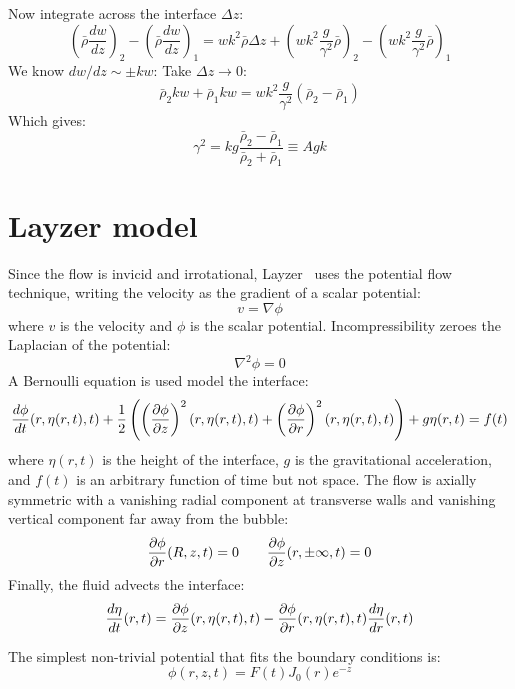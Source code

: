 Now integrate across the interface $\Delta z$:
$$ \left(\bar\rho \frac{dw}{dz}\right)_2 - \left(\bar\rho \frac{dw}{dz}\right)_1 = w k^2 \bar\rho \Delta z  + \left(w k^2 \frac{ g }{\gamma^2}  \bar\rho\right)_2 - \left(w k^2 \frac{ g }{\gamma^2}  \bar\rho\right)_1  $$
We know $dw/dz \sim \pm k w$: Take $\Delta z \rightarrow 0$:
$$ \bar\rho_2 k w + \bar\rho_1 k w = w k^2 \frac{ g }{\gamma^2}  (\bar\rho_2 - \bar\rho_1) $$
Which gives:
$$ \gamma^2 = k g \frac{\bar\rho_2 - \bar\rho_1}{\bar\rho_2+\bar\rho_1}  \equiv A g k $$

\section{Layzer model} 
Since the flow is invicid and irrotational, Layzer~\cite{Layzer1955} uses the potential flow technique, writing the velocity as the gradient of a scalar potential:
\begin{equation}
v = \nabla \phi
\end{equation}
where 
$v$ is the velocity and 
$\phi$ is the scalar potential.
Incompressibility zeroes the Laplacian of the potential:
\begin{equation}
\nabla^2 \phi = 0
\end{equation}
A Bernoulli equation is used model the interface:
\begin{equation} \elabel{layzer_jump}
\der{\phi}{t}(r, \eta(r,t), t) + \frac{1}{2} \left(\left(\pder{\phi}{z}\right)^2(r, \eta(r,t), t) +\left(\pder{\phi}{r}\right)^2(r, \eta(r,t), t)\right) + g \eta(r,t) = f(t)
\end{equation}
where 
$\eta(r,t)$ is the height of the interface,
$g$ is the gravitational acceleration, and 
$f(t)$ is an arbitrary function of time but not space.
The flow is axially symmetric with a vanishing radial component at transverse walls and vanishing vertical component far away from the bubble:
\begin{equation}
\frac{\partial \phi}{\partial r}(R,z,t) = 0 \qquad \frac{\partial \phi}{\partial z}(r, \pm \infty, t) = 0
\end{equation}
Finally, the fluid advects the interface:
\begin{equation} \elabel{layzer_adv}
\der{\eta}{t}(r,t) = \pder{\phi}{z}(r, \eta(r,t), t) - \pder{\phi}{r}(r, \eta(r,t), t) \der{\eta}{r}(r,t)
\end{equation}

The simplest non-trivial potential that fits the boundary conditions is:
\begin{equation}
\phi(r,z,t) = F(t) J_0(r) e^{-z}
\end{equation}

